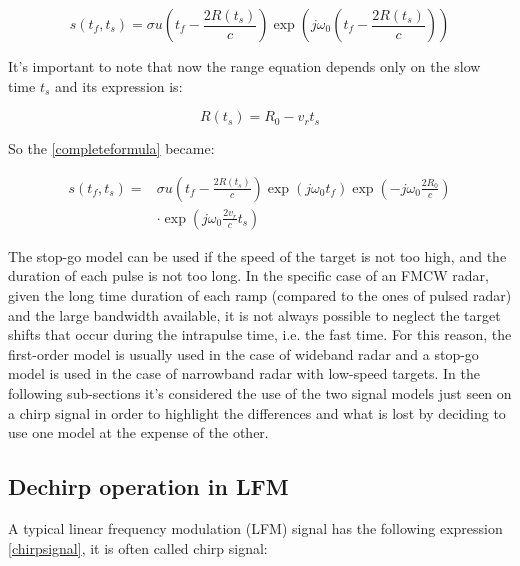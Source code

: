 \begin{itemize}
    \begin{equation}
    s\left(t_{f}, t_{s}\right)=\sigma u\left(t_{f}-\frac{2 R\left(t_{s}\right)}{c}\right) \exp \left(j \omega_{0}\left(t_{f}-\frac{2 R\left(t_{s}\right)}{c}\right)\right)
    \end{equation}
    
    It's important to note that now the range equation depends only on the slow time $t_{s}$ and its expression is:
    
    \begin{equation}
    R\left(t_{s}\right)=R_{0}-v_{r} t_{s}
    \label{range_slow_fast_time}
    \end{equation}
\end{itemize}

So the \ref{completeformula} became:

\begin{equation}
     \begin{aligned}
     s\left(t_{f}, t_{s}\right)=& \sigma         u\left(t_{f}-\frac{2 R\left(t_{s}\right) }{c}\right) \exp\left(j \omega_{0} t_{f}\right) \exp \left(-j \omega_{0} \frac{2             R_{0}}{c}\right) \\
     & \cdot  \exp \left(j         \omega_{0} \frac{2 v_{r}}{c} t_{s}\right)
     \end{aligned}
     \label{stopgomodelformula}
\end{equation}

The stop-go model can be used if the speed of the target is not too high, and the duration of each pulse is not too long. In the specific case of an FMCW radar, given the long time duration of each ramp (compared to the ones of pulsed radar) and the large bandwidth available, it is not always possible to neglect the target shifts that occur during the intrapulse time, i.e. the fast time. For this reason, the first-order model is usually used in the case of wideband radar and a stop-go model is used in the case of narrowband radar with low-speed targets. In the following sub-sections it's considered the use of the two signal models just seen on a chirp signal in order to highlight the differences and what is lost by deciding to use one model at the expense of the other.

\subsection{Dechirp operation in LFM}
A typical linear frequency modulation (LFM) signal has the following expression \ref{chirpsignal}, it is often called chirp signal:

